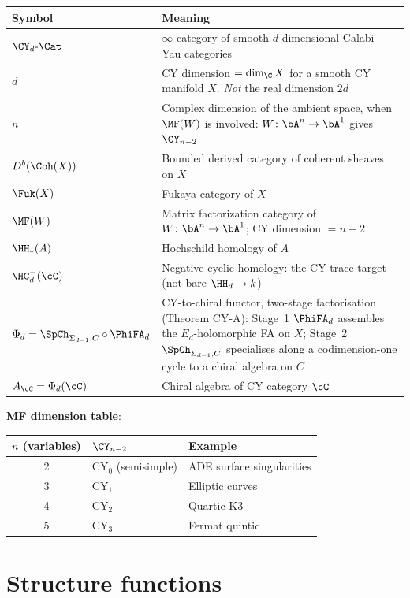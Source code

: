 \begin{center}
\begin{tabular}{@{}lp{8cm}@{}}
\toprule
\textbf{Symbol} & \textbf{Meaning} \\
\midrule
$\CY_d\text{-}\Cat$ & $\infty$-category of smooth
 $d$-dimensional Calabi--Yau categories \\
$d$ & CY dimension $= \dim_\C X$ for a smooth CY manifold $X$.
 \emph{Not} the real dimension $2d$ \\
$n$ & Complex dimension of the ambient space, when $\MF(W)$ is
 involved: $W \colon \bA^n \to \bA^1$ gives $\CY_{n-2}$
 \\
$D^b(\Coh(X))$ & Bounded derived category of coherent sheaves on $X$ \\
$\Fuk(X)$ & Fukaya category of $X$ \\
$\MF(W)$ & Matrix factorization category of
 $W \colon \bA^n \to \bA^1$; CY dimension $= n - 2$ \\
$\HH_*(A)$ & Hochschild homology of $A$ \\
$\HC^-_d(\cC)$ & Negative cyclic homology: the CY trace target
 (not bare $\HH_d \to k$) \\
$\Phi_d = \SpCh_{\Sigma_{d-1},C} \circ \PhiFA_d$
 & CY-to-chiral functor, two-stage factorisation (Theorem CY-A):
 Stage~1 $\PhiFA_d$ assembles the $E_d$-holomorphic FA on $X$;
 Stage~2 $\SpCh_{\Sigma_{d-1},C}$ specialises along a
 codimension-one cycle to a chiral algebra on $C$ \\
$A_\cC = \Phi_d(\cC)$ & Chiral algebra of CY category $\cC$ \\
\bottomrule
\end{tabular}
\end{center}

\noindent
\textbf{MF dimension table}:
\begin{center}
\begin{tabular}{@{}cll@{}}
\toprule
$n$ (variables) & $\CY_{n-2}$ & Example \\
\midrule
2 & CY$_0$ (semisimple) & ADE surface singularities \\
3 & CY$_1$ & Elliptic curves \\
4 & CY$_2$ & Quartic K3 \\
5 & CY$_3$ & Fermat quintic \\
\bottomrule
\end{tabular}
\end{center}

\section{Structure functions}
\label{sec:nc-structure}

